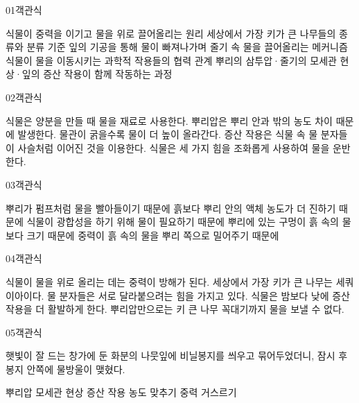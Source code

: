 \documentclass[fs85,seriesRus]{korfarm-base}
\begin{document}
\par\medskip
\kfBeginMC
\begin{kfQBlock}{01}{객관식}
\begin{kfChoices}
\kfChoice 식물이 중력을 이기고 물을 위로 끌어올리는 원리
\kfChoice 세상에서 가장 키가 큰 나무들의 종류와 분류 기준
\kfChoice 잎의 기공을 통해 물이 빠져나가며 줄기 속 물을 끌어올리는 메커니즘
\kfChoice 식물이 물을 이동시키는 과학적 작용들의 협력 관계
\kfChoice 뿌리의 삼투압·줄기의 모세관 현상·잎의 증산 작용이 함께 작동하는 과정
\end{kfChoices}
\end{kfQBlock}
\begin{kfQBlock}{02}{객관식}
\begin{kfChoices}
\kfChoice 식물은 양분을 만들 때 물을 재료로 사용한다.
\kfChoice 뿌리압은 뿌리 안과 밖의 농도 차이 때문에 발생한다.
\kfChoice 물관이 굵을수록 물이 더 높이 올라간다.
\kfChoice 증산 작용은 식물 속 물 분자들이 사슬처럼 이어진 것을 이용한다.
\kfChoice 식물은 세 가지 힘을 조화롭게 사용하여 물을 운반한다.
\end{kfChoices}
\end{kfQBlock}
\begin{kfQBlock}{03}{객관식}
\begin{kfChoices}
\kfChoice 뿌리가 펌프처럼 물을 빨아들이기 때문에
\kfChoice 흙보다 뿌리 안의 액체 농도가 더 진하기 때문에
\kfChoice 식물이 광합성을 하기 위해 물이 필요하기 때문에
\kfChoice 뿌리에 있는 구멍이 흙 속의 물보다 크기 때문에
\kfChoice 중력이 흙 속의 물을 뿌리 쪽으로 밀어주기 때문에
\end{kfChoices}
\end{kfQBlock}
\begin{kfQBlock}{04}{객관식}
\begin{kfChoices}
\kfChoice 식물이 물을 위로 올리는 데는 중력이 방해가 된다.
\kfChoice 세상에서 가장 키가 큰 나무는 세쿼이아이다.
\kfChoice 물 분자들은 서로 달라붙으려는 힘을 가지고 있다.
\kfChoice 식물은 밤보다 낮에 증산 작용을 더 활발하게 한다.
\kfChoice 뿌리압만으로는 키 큰 나무 꼭대기까지 물을 보낼 수 없다.
\end{kfChoices}
\end{kfQBlock}
\begin{kfQBlock}{05}{객관식}
\begin{kfEvidence}햇빛이 잘 드는 창가에 둔 화분의 나뭇잎에 비닐봉지를 씌우고 묶어두었더니, 잠시 후 봉지 안쪽에 물방울이 맺혔다.\end{kfEvidence}
\begin{kfChoices}
\kfChoice 뿌리압
\kfChoice 모세관 현상
\kfChoice 증산 작용
\kfChoice 농도 맞추기
\kfChoice 중력 거스르기
\end{kfChoices}
\end{kfQBlock}
\end{document}
